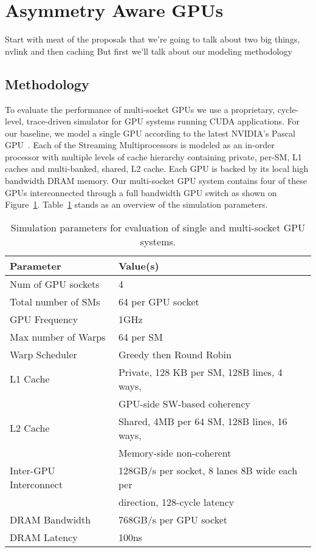 \section{Asymmetry Aware GPUs}

Start with meat of the proposals that we're going to talk about two big things, nvlink and then caching
But first we'll talk about our modeling methodology


\subsection{Methodology}
\label{methodology}


To evaluate the performance of multi-socket GPUs we use a proprietary, 
cycle-level, trace-driven simulator for GPU systems running CUDA applications. 
For our baseline, we model a single GPU according to the latest NVIDIA's Pascal 
GPU~\cite{inside-pascal}. Each of the Streaming Multiprocessors is modeled as an 
in-order processor with multiple levels of cache hierarchy containing private, 
per-SM, L1 caches and multi-banked, shared, L2 cache. Each GPU is backed by its 
local high bandwidth DRAM memory. Our multi-socket GPU system contains four of 
these GPUs interconnected through a full bandwidth GPU switch as shown on 
Figure~\ref{}. Table~\ref{tab:setup} stands as an overview of the simulation 
parameters.

\begin{table}[tp]
\begin{small}
\centering
\begin{tabular}{ll}
\toprule
\textbf{Parameter} & \textbf{Value(s)} \\
\toprule
Num of GPU sockets & 4 \\
\midrule
Total number of SMs & 64 per GPU socket \\
\midrule
GPU Frequency & 1GHz \\
\midrule
Max number of Warps & 64 per SM \\
\midrule
Warp Scheduler & Greedy then Round Robin \\
\midrule
L1 Cache & Private, 128 KB per SM, 128B lines, 4 ways, \\ & GPU-side SW-based coherency \\
\midrule
L2 Cache & Shared, 4MB per 64 SM, 128B lines, 16 ways, \\ & Memory-side non-coherent\\
\midrule
Inter-GPU Interconnect & 128GB/s per socket, 8 lanes 8B wide each per \\ & direction, 128-cycle latency \\
\midrule
DRAM Bandwidth & 768GB/s per GPU socket\\
\midrule
DRAM Latency & 100ns \\
\toprule
\end{tabular}
\caption{Simulation parameters for evaluation of single and multi-socket GPU systems.}
\label{tab:setup}
\end{small}
\end{table}

